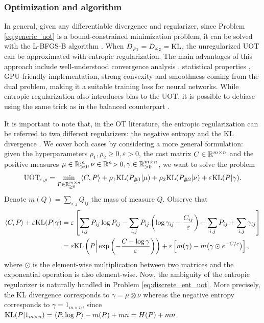 \subsubsection{Optimization and algorithm} \label{sub:uot_optim}

In general, given any differentiable divergence and regularizer, since Problem \eqref{eq:generic_uot}
is a bound-constrained minimization problem, it can be solved with the L-BFGS-B algorithm
\citep{Byrd95,Zhu97}. When $D_{\varphi_1} = D_{\varphi_2} = \text{KL}$, the unregularized UOT can
be approximated with entropic regularization. The main advantages of this approach include
well-understood convergence analysis \citep{Chizat18a}, statistical properties \citep{Sejourne19},
GPU-friendly implementation, strong convexity and smoothness coming from the dual problem,
making it a suitable training loss for neural networks.
While entropic regularization also introduces bias to the UOT, it is possible to debiase
using the same trick as in the balanced counterpart \citep{Sejourne19}.

It is important to note that, in the OT literature, the entropic regularization
can be referred to two different regularizers: the negative entropy \citep{Frogner15, Chizat18a} and
the KL divergence \citep{Sejourne19}. We cover both cases by considering a
more general formulation: given the hyperparameters
$\rho_1, \rho_2 \geq 0, \varepsilon > 0$, the cost matrix $C \in \mathbb R^{m \times n}$
and the positive measures $\mu \in \mathbb R^m_{> 0}, \nu \in \mathbb R^n{> 0}, \gamma \in \mathbb R^{m \times n}_{> 0}$,
we want to solve the problem
\begin{align}
  \label{eq:discrete_ent_uot}
  \text{UOT}_{\varepsilon, \rho} = \min_{P \in \mathbb R^{m \times n}_{\geq 0}} \langle C, P \rangle + \rho_1 \text{KL}(P_{\# 1} | \mu)
  + \rho_2 \text{KL}(P_{\# 2} | \nu) + \varepsilon \text{KL}(P | \gamma).
\end{align}
Denote $m(Q) = \sum_{i, j} Q_{ij}$ the mass of measure $Q$. Observe that
\begin{align}
  \langle C, P \rangle + \varepsilon \text{KL}(P | \gamma) &=
  \varepsilon \left[ \sum_{i, j} P_{ij} \log P_{ij} -
  \sum_{i, j} P_{ij} \left( \log \gamma_{ij} - \frac{C_{ij}}{\varepsilon} \right)
  - \sum_{i, j} P_{ij} + \sum_{i, j} \gamma_{ij} \right] \\
  &= \varepsilon \text{KL} \left(P \Big| \exp \left( -\frac{C - \log \gamma}{\varepsilon} \right) \right)
  + \varepsilon \left[ m(\gamma) - m \big(\gamma \odot e^{-C / \varepsilon} \big) \right],
\end{align}
where $\odot$ is the element-wise multiplication between two matrices and the exponential operation
is also element-wise. Now, the ambiguity of the entropic regularizer is naturally handled in
Problem \eqref{eq:discrete_ent_uot}. More precisely,
the KL divergence corresponds to $\gamma = \mu \otimes \nu$ whereas
the negative entropy corresponds to $\gamma = 1_{m \times n}$,
since $\text{KL}(P | 1_{m \times n}) = \langle P, \log P \rangle - m(P) + mn = H(P) + mn$.

